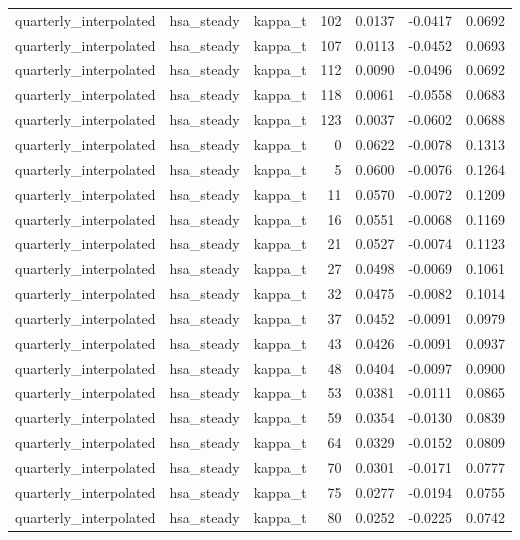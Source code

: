 \begin{tabular}{lllrrrr}
quarterly\_interpolated & hsa\_steady & kappa\_t & 102 & 0.0137 & -0.0417 & 0.0692 \\
quarterly\_interpolated & hsa\_steady & kappa\_t & 107 & 0.0113 & -0.0452 & 0.0693 \\
quarterly\_interpolated & hsa\_steady & kappa\_t & 112 & 0.0090 & -0.0496 & 0.0692 \\
quarterly\_interpolated & hsa\_steady & kappa\_t & 118 & 0.0061 & -0.0558 & 0.0683 \\
quarterly\_interpolated & hsa\_steady & kappa\_t & 123 & 0.0037 & -0.0602 & 0.0688 \\
quarterly\_interpolated & hsa\_steady & kappa\_t & 0 & 0.0622 & -0.0078 & 0.1313 \\
quarterly\_interpolated & hsa\_steady & kappa\_t & 5 & 0.0600 & -0.0076 & 0.1264 \\
quarterly\_interpolated & hsa\_steady & kappa\_t & 11 & 0.0570 & -0.0072 & 0.1209 \\
quarterly\_interpolated & hsa\_steady & kappa\_t & 16 & 0.0551 & -0.0068 & 0.1169 \\
quarterly\_interpolated & hsa\_steady & kappa\_t & 21 & 0.0527 & -0.0074 & 0.1123 \\
quarterly\_interpolated & hsa\_steady & kappa\_t & 27 & 0.0498 & -0.0069 & 0.1061 \\
quarterly\_interpolated & hsa\_steady & kappa\_t & 32 & 0.0475 & -0.0082 & 0.1014 \\
quarterly\_interpolated & hsa\_steady & kappa\_t & 37 & 0.0452 & -0.0091 & 0.0979 \\
quarterly\_interpolated & hsa\_steady & kappa\_t & 43 & 0.0426 & -0.0091 & 0.0937 \\
quarterly\_interpolated & hsa\_steady & kappa\_t & 48 & 0.0404 & -0.0097 & 0.0900 \\
quarterly\_interpolated & hsa\_steady & kappa\_t & 53 & 0.0381 & -0.0111 & 0.0865 \\
quarterly\_interpolated & hsa\_steady & kappa\_t & 59 & 0.0354 & -0.0130 & 0.0839 \\
quarterly\_interpolated & hsa\_steady & kappa\_t & 64 & 0.0329 & -0.0152 & 0.0809 \\
quarterly\_interpolated & hsa\_steady & kappa\_t & 70 & 0.0301 & -0.0171 & 0.0777 \\
quarterly\_interpolated & hsa\_steady & kappa\_t & 75 & 0.0277 & -0.0194 & 0.0755 \\
quarterly\_interpolated & hsa\_steady & kappa\_t & 80 & 0.0252 & -0.0225 & 0.0742 \\

\end{tabular}
